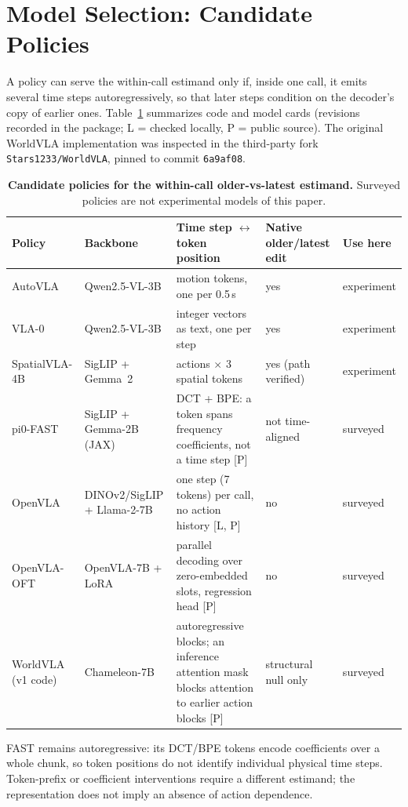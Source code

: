 \section{Model Selection: Candidate Policies}
\label{sec:models}
A policy can serve the within-call estimand only if, inside one call, it emits several time steps autoregressively, so that later steps condition on the decoder's copy of earlier ones. Table~\ref{tab:models} summarizes code and model cards (revisions recorded in the package; L = checked locally, P = public source). The original WorldVLA implementation was inspected in the third-party fork \texttt{Stars1233/WorldVLA}, pinned to commit \texttt{6a9af08}.

\begin{table}[h]
\centering\footnotesize
\caption{\textbf{Candidate policies for the within-call older-vs-latest estimand.} Surveyed policies are not experimental models of this paper.}
\label{tab:models}
\begin{tabularx}{\textwidth}{@{}l >{\raggedright\arraybackslash}p{2.5cm} >{\raggedright\arraybackslash}X >{\raggedright\arraybackslash}p{3.0cm} l@{}}\toprule
Policy & Backbone & Time step $\leftrightarrow$ token position & Native older/latest edit & Use here\\\midrule
AutoVLA & Qwen2.5-VL-3B & 10 motion tokens, one per 0.5\,s & yes & experiment\\
VLA-0 & Qwen2.5-VL-3B & 8 integer vectors as text, one per step & yes & experiment\\
SpatialVLA-4B & SigLIP + Gemma~2 & 4 actions $\times$ 3 spatial tokens & yes (path verified) & experiment\\
pi0-FAST & SigLIP + Gemma-2B (JAX) & DCT + BPE: a token spans frequency coefficients, not a time step [P] & not time-aligned & surveyed\\
OpenVLA & DINOv2/SigLIP + Llama-2-7B & one step (7 tokens) per call, no action history [L, P] & no & surveyed\\
OpenVLA-OFT & OpenVLA-7B + LoRA & parallel decoding over zero-embedded slots, regression head [P] & no & surveyed\\
WorldVLA (v1 code) & Chameleon-7B & autoregressive blocks; an inference attention mask blocks attention to earlier action blocks [P] & structural null only & surveyed\\\bottomrule
\end{tabularx}
\end{table}

FAST remains autoregressive: its DCT/BPE tokens encode coefficients over a whole chunk, so token positions do not identify individual physical time steps. Token-prefix or coefficient interventions require a different estimand; the representation does not imply an absence of action dependence.

